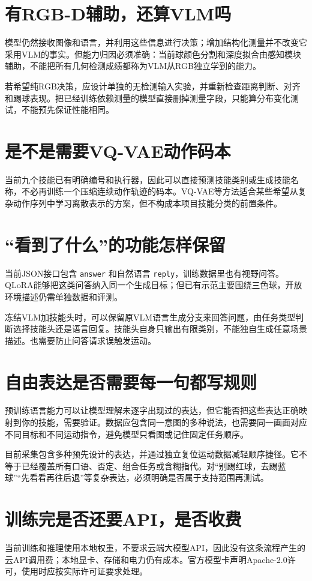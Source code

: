 \section{有RGB-D辅助，还算VLM吗}
模型仍然接收图像和语言，并利用这些信息进行决策；增加结构化测量并不改变它采用VLM的事实。但能力归因必须准确：当前球颜色分割和深度拟合由感知模块辅助，不能把所有几何检测成绩都称为VLM从RGB独立学到的能力。

若希望纯RGB决策，应设计单独的无检测输入实验，并重新检查距离判断、对齐和踢球表现。把已经训练依赖测量的模型直接删掉测量字段，只能算分布变化测试，不能预先保证性能相同。

\section{是不是需要VQ-VAE动作码本}
当前九个技能已有明确编号和执行器，因此可以直接预测技能类别或生成技能名称，不必再训练一个压缩连续动作轨迹的码本。VQ-VAE等方法适合某些希望从复杂动作序列中学习离散表示的方案，但不构成本项目技能分类的前置条件。

\section{“看到了什么”的功能怎样保留}
当前JSON接口包含 \texttt{answer} 和自然语言 \texttt{reply}，训练数据里也有视野问答。QLoRA能够把这类问答纳入同一个生成目标；但已有示范主要围绕三色球，开放环境描述仍需单独数据和评测。

冻结VLM加技能头时，可以保留原VLM语言生成分支来回答问题，由任务类型判断选择技能头还是语言回复。技能头自身只输出有限类别，不能独自生成任意场景描述。也需要防止问答请求误触发运动。

\section{自由表达是否需要每一句都写规则}
预训练语言能力可以让模型理解未逐字出现过的表达，但它能否把这些表达正确映射到你的技能，需要验证。数据应包含同一意图的多种说法，也需要同一画面对应不同目标和不同运动指令，避免模型只看图或记住固定任务顺序。

目前采集包含多种预先设计的表达，并通过独立复位运动数据减轻顺序捷径。它不等于已经覆盖所有口语、否定、组合任务或含糊指代。对“别踢红球，去踢蓝球”“先看看再往后退”等复杂表达，必须明确是否属于支持范围再测试。

\section{训练完是否还要API，是否收费}
当前训练和推理使用本地权重，不要求云端大模型API，因此没有这条流程产生的云API调用费；本地显卡、存储和电力仍有成本。官方模型卡声明Apache-2.0许可，使用时应按实际许可证要求处理。\cite{qwen-card}

